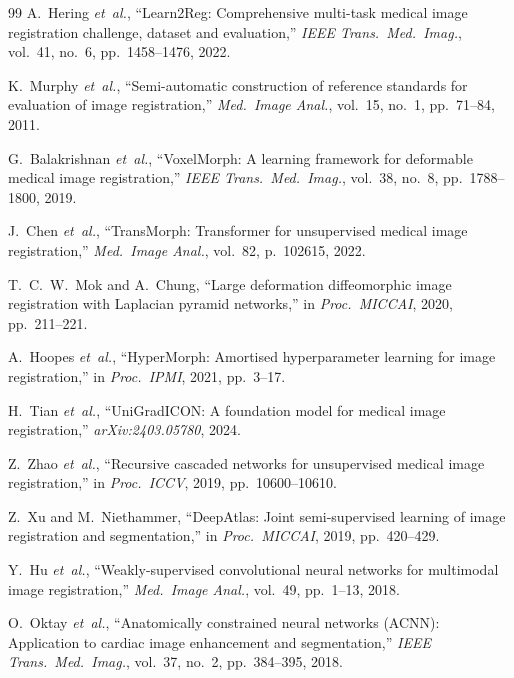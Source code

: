 \documentclass[10pt,twocolumn]{article}
\begin{document}
\begin{thebibliography}{99}
A.~Hering \emph{et~al.},
``Learn2Reg: Comprehensive multi-task medical image registration challenge,
dataset and evaluation,''
\emph{IEEE Trans.\ Med.\ Imag.}, vol.~41, no.~6, pp.~1458--1476, 2022.

K.~Murphy \emph{et~al.},
``Semi-automatic construction of reference standards for evaluation of
image registration,''
\emph{Med.\ Image Anal.}, vol.~15, no.~1, pp.~71--84, 2011.

G.~Balakrishnan \emph{et~al.},
``VoxelMorph: A learning framework for deformable medical image
registration,''
\emph{IEEE Trans.\ Med.\ Imag.}, vol.~38, no.~8, pp.~1788--1800, 2019.

J.~Chen \emph{et~al.},
``TransMorph: Transformer for unsupervised medical image registration,''
\emph{Med.\ Image Anal.}, vol.~82, p.~102615, 2022.

T.~C.~W.~Mok and A.~Chung,
``Large deformation diffeomorphic image registration with Laplacian
pyramid networks,''
in \emph{Proc.\ MICCAI}, 2020, pp.~211--221.

A.~Hoopes \emph{et~al.},
``HyperMorph: Amortised hyperparameter learning for image registration,''
in \emph{Proc.\ IPMI}, 2021, pp.~3--17.

H.~Tian \emph{et~al.},
``UniGradICON: A foundation model for medical image registration,''
\emph{arXiv:2403.05780}, 2024.

Z.~Zhao \emph{et~al.},
``Recursive cascaded networks for unsupervised medical image registration,''
in \emph{Proc.\ ICCV}, 2019, pp.~10600--10610.

Z.~Xu and M.~Niethammer,
``DeepAtlas: Joint semi-supervised learning of image registration and
segmentation,''
in \emph{Proc.\ MICCAI}, 2019, pp.~420--429.

Y.~Hu \emph{et~al.},
``Weakly-supervised convolutional neural networks for multimodal image
registration,''
\emph{Med.\ Image Anal.}, vol.~49, pp.~1--13, 2018.

O.~Oktay \emph{et~al.},
``Anatomically constrained neural networks (ACNN): Application to
cardiac image enhancement and segmentation,''
\emph{IEEE Trans.\ Med.\ Imag.}, vol.~37, no.~2, pp.~384--395, 2018.


\end{thebibliography}
\end{document}
